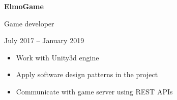 \noindent \textbf{ElmoGame} \par
Game developer \par
July 2017 – January 2019 \par
\begin{itemize}
    \item Work with Unity3d engine
    \item Apply software design patterns in the project
    \item Communicate with game server using REST APIs
\end{itemize}
\vspace{15pt}


